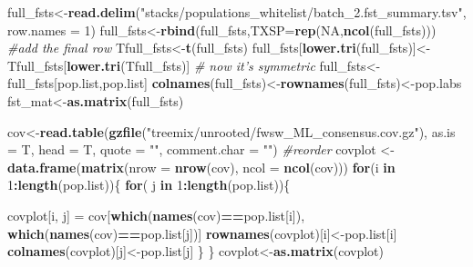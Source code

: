 \documentclass[11pt,]{article}
\newenvironment{Shaded}{\begin{snugshade}}{\end{snugshade}}
\newcommand{\KeywordTok}[1]{\textcolor[rgb]{0.13,0.29,0.53}{\textbf{#1}}}
\newcommand{\DataTypeTok}[1]{\textcolor[rgb]{0.13,0.29,0.53}{#1}}
\newcommand{\DecValTok}[1]{\textcolor[rgb]{0.00,0.00,0.81}{#1}}
\newcommand{\StringTok}[1]{\textcolor[rgb]{0.31,0.60,0.02}{#1}}
\newcommand{\CommentTok}[1]{\textcolor[rgb]{0.56,0.35,0.01}{\textit{#1}}}
\newcommand{\OtherTok}[1]{\textcolor[rgb]{0.56,0.35,0.01}{#1}}
\newcommand{\ControlFlowTok}[1]{\textcolor[rgb]{0.13,0.29,0.53}{\textbf{#1}}}
\newcommand{\OperatorTok}[1]{\textcolor[rgb]{0.81,0.36,0.00}{\textbf{#1}}}
\newcommand{\NormalTok}[1]{#1}
\begin{document}
\begin{Shaded}
\begin{Highlighting}[]
\NormalTok{full_fsts<-}\KeywordTok{read.delim}\NormalTok{(}\StringTok{"stacks/populations_whitelist/batch_2.fst_summary.tsv"}\NormalTok{,}
                      \DataTypeTok{row.names =} \DecValTok{1}\NormalTok{)}
\NormalTok{full_fsts<-}\KeywordTok{rbind}\NormalTok{(full_fsts,}\DataTypeTok{TXSP=}\KeywordTok{rep}\NormalTok{(}\OtherTok{NA}\NormalTok{,}\KeywordTok{ncol}\NormalTok{(full_fsts))) }\CommentTok{#add the final row}
\NormalTok{Tfull_fsts<-}\KeywordTok{t}\NormalTok{(full_fsts)}
\NormalTok{full_fsts[}\KeywordTok{lower.tri}\NormalTok{(full_fsts)]<-Tfull_fsts[}\KeywordTok{lower.tri}\NormalTok{(Tfull_fsts)] }\CommentTok{# now it's symmetric}
\NormalTok{full_fsts<-full_fsts[pop.list,pop.list]}
\KeywordTok{colnames}\NormalTok{(full_fsts)<-}\KeywordTok{rownames}\NormalTok{(full_fsts)<-pop.labs}
\NormalTok{fst_mat<-}\KeywordTok{as.matrix}\NormalTok{(full_fsts)}
\end{Highlighting}
\end{Shaded}

\begin{Shaded}
\begin{Highlighting}[]
\NormalTok{cov<-}\KeywordTok{read.table}\NormalTok{(}\KeywordTok{gzfile}\NormalTok{(}\StringTok{"treemix/unrooted/fwsw_ML_consensus.cov.gz"}\NormalTok{), }\DataTypeTok{as.is =}\NormalTok{ T, }\DataTypeTok{head =}\NormalTok{ T, }\DataTypeTok{quote =} \StringTok{""}\NormalTok{, }
                \DataTypeTok{comment.char =} \StringTok{""}\NormalTok{)}
\CommentTok{#reorder}
\NormalTok{covplot <-}\StringTok{ }\KeywordTok{data.frame}\NormalTok{(}\KeywordTok{matrix}\NormalTok{(}\DataTypeTok{nrow =} \KeywordTok{nrow}\NormalTok{(cov), }\DataTypeTok{ncol =} \KeywordTok{ncol}\NormalTok{(cov)))}
\ControlFlowTok{for}\NormalTok{(i }\ControlFlowTok{in} \DecValTok{1}\OperatorTok{:}\KeywordTok{length}\NormalTok{(pop.list))\{}
  \ControlFlowTok{for}\NormalTok{( j }\ControlFlowTok{in} \DecValTok{1}\OperatorTok{:}\KeywordTok{length}\NormalTok{(pop.list))\{}
    
\NormalTok{    covplot[i, j] =}\StringTok{ }\NormalTok{cov[}\KeywordTok{which}\NormalTok{(}\KeywordTok{names}\NormalTok{(cov)}\OperatorTok{==}\NormalTok{pop.list[i]), }\KeywordTok{which}\NormalTok{(}\KeywordTok{names}\NormalTok{(cov)}\OperatorTok{==}\NormalTok{pop.list[j])]}
    \KeywordTok{rownames}\NormalTok{(covplot)[i]<-pop.list[i]}
    \KeywordTok{colnames}\NormalTok{(covplot)[j]<-pop.list[j]}
\NormalTok{  \}}
\NormalTok{\}}
\NormalTok{covplot<-}\KeywordTok{as.matrix}\NormalTok{(covplot)}
\end{Highlighting}
\end{Shaded}
\end{document}
